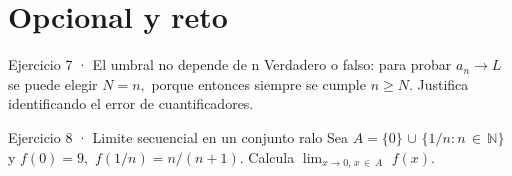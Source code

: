 \documentclass[10pt,a4paper,oneside,openany]{book}
\begin{document}
\section*{Opcional y reto}
\begin{PSevenOptionalFixed}{Ejercicio 7 · El umbral no depende de n}
Verdadero o falso: para probar \(a_n\to L\) se puede elegir \(N=n,\) porque entonces siempre se cumple \(n\ge N\). Justifica identificando el error de cuantificadores.
\end{PSevenOptionalFixed}
\begin{PSevenOptionalFixed}{Ejercicio 8 · Limite secuencial en un conjunto ralo}
Sea \(A=\{0\}\) \(\cup \) \(\{1/n:n\,\in \,\mathbb{N}\}\) y \(f(0)=9,\) \(f(1/n)=n/(n+1)\). Calcula \(\lim_{x\to 0,\,x\,\in \,A}\) \(f(x)\).
\end{PSevenOptionalFixed}
\end{document}
